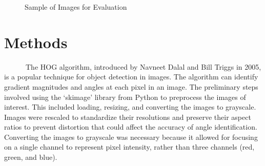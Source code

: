 \documentclass[
  letterpaper,
  DIV=11,
  numbers=noendperiod]{scrreprt}
\begin{document}
\begin{figure}
\begin{minipage}{0.50\linewidth}
{}


\end{minipage}%
%
\begin{minipage}{0.50\linewidth}



\end{minipage}%

\caption{\label{fig-images}Sample of Images for Evaluation}

\end{figure}%


\chapter{Methods}\label{methods}

~~~~~~The HOG algorithm, introduced by Navneet Dalal and Bill Triggs in
2005, is a popular technique for object detection in images. The
algorithm can identify gradient magnitudes and angles at each pixel in
an image. The preliminary steps involved using the `skimage' library
from Python to preprocess the images of interest. This included loading,
resizing, and converting the images to grayscale. Images were rescaled
to standardize their resolutions and preserve their aspect ratios to
prevent distortion that could affect the accuracy of angle
identification. Converting the images to grayscale was necessary because
it allowed for focusing on a single channel to represent pixel
intensity, rather than three channels (red, green, and blue).
\end{document}
